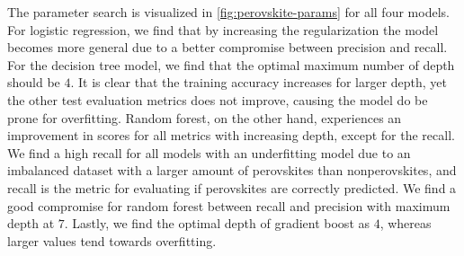 \begin{table}[!ht]
\centering
\caption{Table with corresponding best estimators during a grid search scheme for predicting perovskites or not. The test score is here referred to as the mean balanced accuracy score of the models with the same parameters in the cross validation, and we list all standard deviations in paranthesis.}
\label{tab:perovskite-optimal}
\noindent{}
\end{table}

The parameter search is visualized in \autoref{fig:perovskite-params} for all four models. For logistic regression, we find that by increasing the regularization the model becomes more general due to a better compromise between precision and recall. For the decision tree model, we find that the optimal maximum number of depth should be $4$. It is clear that the training accuracy increases for larger depth, yet the other test evaluation metrics does not improve, causing the model do be prone for overfitting. Random forest, on the other hand, experiences an improvement in scores for all metrics with increasing depth, except for the recall. We find a high recall for all models with an underfitting model due to an imbalanced dataset with a larger amount of perovskites than nonperovskites, and recall is the metric for evaluating if perovskites are correctly predicted. We find a good compromise for random forest between recall and precision with maximum depth at $7$. Lastly, we find the optimal depth of gradient boost as $4$, whereas larger values tend towards overfitting.


